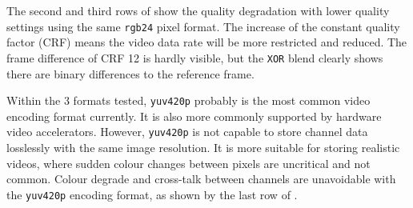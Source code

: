 The second and third rows of  show the quality degradation with lower quality settings using the same \texttt{rgb24} pixel format. The increase of the constant quality factor (CRF) means the video data rate will be more restricted and reduced. The frame difference of CRF 12 is hardly visible, but the \texttt{XOR} blend clearly shows there are binary differences to the reference frame.

Within the 3 formats tested, \texttt{yuv420p} probably is the most common video encoding format currently. It is also more commonly supported by hardware video accelerators. However, \texttt{yuv420p} is not capable to store channel data losslessly with the same image resolution. It is more suitable for storing realistic videos, where sudden colour changes between pixels are uncritical and not common. Colour degrade and cross-talk between channels are unavoidable with the \texttt{yuv420p} encoding format, as shown by the last row of .


